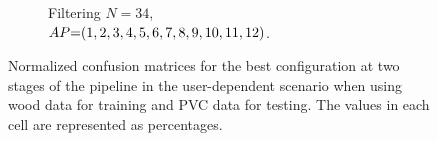\begin{figure}[ht]
\begin{subfigure}{.49\textwidth}
        \vspace{-5pt}
        \captionsetup{width=.99\linewidth}
        \caption{Filtering $N{=}34$, \\ $\splitatcommas{AP{=}(1, 2, 3, 4, 5, 6, 7, 8, 9, 10, 11, 12)}$.}
        \label{fig:radar-experiments:through-materials:wood-pvc-confusion:filtering-ud}
    \end{subfigure}
    
    \vspace{-6pt}
    \caption{Normalized confusion matrices for the best configuration at two stages of the pipeline in the user-dependent scenario when using wood data for training and PVC data for testing. The values in each cell are represented as percentages.}
    \label{fig:radar-experiments:through-materials:wood-pvc-confusion}
\end{figure}








